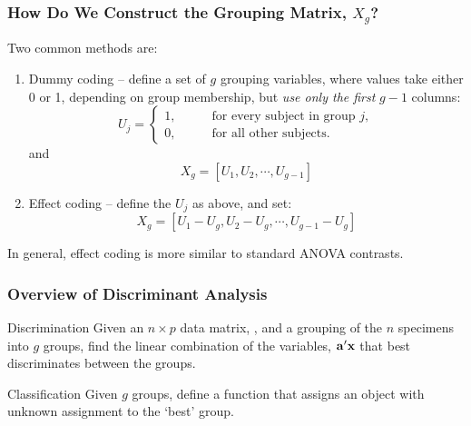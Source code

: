 \documentclass{beamer}
\begin{document}
\begin{frame}
  \frametitle{How Do We Construct the Grouping Matrix, $X_g$?}

Two common methods are: 

\begin{enumerate}
\item Dummy coding -- define a set of $g$ grouping variables, where values take either 0 or 1, depending on group membership, but \emph{use only the first} $g-1$ columns: 
%
\begin{equation*}
U_j = \left\{ 
\begin{aligned}
1, &\qquad \text{for every subject in group } j, \\
0, &\qquad \text{for all other subjects.}  
\end{aligned}
\right.
\end{equation*}
and 
%
$$
X_g= [U_1, U_2, \cdots, U_{g-1}]
$$
%
\item Effect coding -- define the $U_j$ as above, and set:
$$
X_g = [U_1 - U_g, U_2-U_g, \cdots, U_{g-1} - U_g]
$$
\end{enumerate}

In general, effect coding is more similar to standard ANOVA contrasts.

\end{frame}






\begin{frame}
  \frametitle{Overview of Discriminant Analysis}

\begin{block}{Discrimination}
Given an $n \times p$ data matrix, , and a grouping of the $n$ specimens into $g$ groups, find the linear combination of the variables, $\mathbf{a}'\mathbf{x}$ that best discriminates between the groups.
\end{block}

\begin{block}{Classification}
Given $g$ groups, define a function that assigns an object with unknown assignment to the `best' group.
\end{block}


\end{frame}
\end{document}
